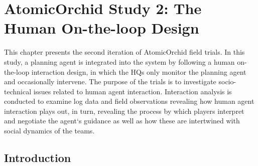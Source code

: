 
\chapter{AtomicOrchid Study 2: The Human On-the-loop Design}\label{ch:studytwo} %
This chapter presents the second iteration of AtomicOrchid field trials. In this study, a planning agent is integrated into the system by following a human on-the-loop interaction design, in which the HQs only monitor the planning agent and occasionally intervene. The purpose of the trials is to investigate socio-technical issues related to human agent interaction. Interaction analysis is conducted to examine log data and field observations revealing how human agent interaction plays out, in turn, revealing the process by which players interpret and negotiate the agent`s guidance as well as how these are intertwined with social dynamics of the teams.

\section{Introduction}\label{sec:studytwointroduction}


